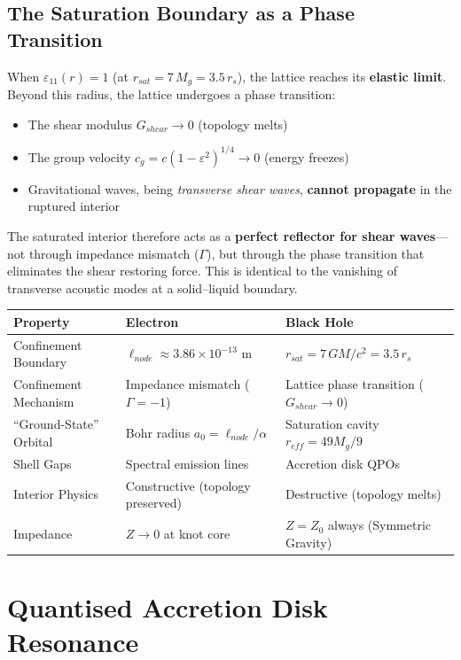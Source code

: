 \subsection{The Saturation Boundary as a Phase Transition}

When $\varepsilon_{11}(r) = 1$ (at $r_{sat} = 7\,M_g = 3.5\,r_s$), the lattice reaches its \textbf{elastic limit}. Beyond this radius, the lattice undergoes a phase transition:
\begin{itemize}
    \item The shear modulus $G_{shear} \to 0$ (topology melts)
    \item The group velocity $c_g = c(1-\varepsilon^2)^{1/4} \to 0$ (energy freezes)
    \item Gravitational waves, being \textit{transverse shear waves}, \textbf{cannot propagate} in the ruptured interior
\end{itemize}

The saturated interior therefore acts as a \textbf{perfect reflector for shear waves}---not through impedance mismatch ($\Gamma$), but through the phase transition that eliminates the shear restoring force. This is identical to the vanishing of transverse acoustic modes at a solid--liquid boundary.

\begin{center}
\renewcommand{\arraystretch}{1.3}
\begin{tabular}{l l l}
\toprule
\textbf{Property} & \textbf{Electron} & \textbf{Black Hole} \\
\midrule
Confinement Boundary & $\ell_{node} \approx 3.86 \times 10^{-13}$ m & $r_{sat} = 7\,GM/c^2 = 3.5\,r_s$ \\
Confinement Mechanism & Impedance mismatch ($\Gamma = -1$) & Lattice phase transition ($G_{shear} \to 0$) \\
``Ground-State'' Orbital & Bohr radius $a_0 = \ell_{node}/\alpha$ & Saturation cavity $r_{eff} = 49M_g/9$ \\
Shell Gaps & Spectral emission lines & Accretion disk QPOs \\
Interior Physics & Constructive (topology preserved) & Destructive (topology melts) \\
Impedance & $Z \to 0$ at knot core & $Z = Z_0$ always (Symmetric Gravity) \\
\bottomrule
\end{tabular}
\end{center}

\section{Quantised Accretion Disk Resonance}

